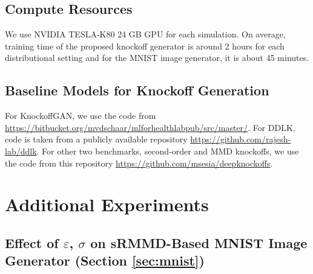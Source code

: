 \documentclass{article}
\theoremstyle{definition}
\begin{document}
\subsection{Compute Resources}
We use NVIDIA TESLA-K80 24 GB GPU for each simulation. On average, training time of the proposed knockoff generator is around 2 hours for each distributional setting and for the MNIST image generator, it is about 45 minutes.
\subsection{Baseline Models for Knockoff Generation}
For KnockoffGAN, we use the code from \url{https://bitbucket.org/mvdschaar/mlforhealthlabpub/src/master/}. For DDLK, code is taken from a publicly available repository \url{https://github.com/rajesh-lab/ddlk}. For other two benchmarks, second-order and MMD knockoffs, we use the code from this repository \url{https://github.com/msesia/deepknockoffs}. 

\section{Additional Experiments}
\subsection{Effect of \texorpdfstring{$\varepsilon$}{epsilon}, \texorpdfstring{$\sigma$}{sigma} on sRMMD-Based MNIST Image Generator (Section \ref{sec:mnist})}\label{supp:mnist}
\end{document}
